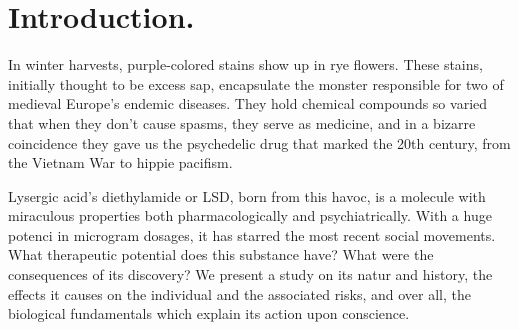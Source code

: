 \section{Introduction.}

In winter harvests, purple-colored stains show up in rye flowers. These stains, initially thought to be excess sap, encapsulate the monster responsible for two of medieval Europe's endemic diseases. They hold chemical compounds so varied that when they don't cause spasms, they serve as medicine, and in a bizarre coincidence they gave us the psychedelic drug that marked the 20th century, from the Vietnam War to hippie pacifism.

Lysergic acid's diethylamide or LSD, born from this havoc, is a molecule with miraculous properties both pharmacologically and psychiatrically. With a huge potenci in microgram dosages, it has starred the most recent social movements. What therapeutic potential does this substance have? What were the consequences of its discovery? We present a study on its natur and history, the effects it causes on the individual and the associated risks, and over all, the biological fundamentals which explain its action upon conscience.

\newpage
